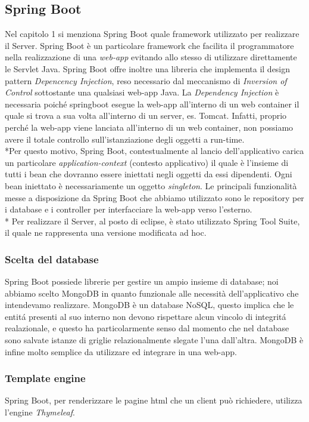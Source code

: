 \subsection{Spring Boot}
Nel capitolo 1 si menziona Spring Boot quale framework utilizzato per realizzare il Server. Spring Boot \`e un particolare framework che facilita il programmatore nella realizzazione di una \emph{web-app} evitando allo stesso di utilizzare direttamente le Servlet Java. Spring Boot offre inoltre una libreria che implementa il design pattern \emph{Depencency Injection}, reso necessario dal meccanismo di \emph{Inversion of Control} sottostante una qualsiasi web-app Java. La \emph{Dependency Injection} \`e necessaria poich\'e springboot esegue la web-app all'interno di un web container il quale si trova a sua volta all'interno di un server, es. Tomcat. Infatti, proprio perch\'e la web-app viene lanciata all'interno di un web container, non possiamo avere il totale controllo sull'istanziazione degli oggetti a run-time.\\*Per questo motivo, Spring Boot, contestualmente al lancio dell'applicativo carica un particolare \emph{application-context} (contesto applicativo) il quale \`e l'insieme di tutti i bean che dovranno essere iniettati negli oggetti da essi dipendenti. Ogni bean iniettato \`e necessariamente un oggetto \emph{singleton}.
Le principali funzionalit\`a messe a disposizione da Spring Boot che abbiamo utilizzato sono le repository per i database e i controller per interfacciare la web-app verso l'esterno.\\*
Per realizzare il Server, al posto di eclipse, \`e stato utilizzato Spring Tool Suite, il quale ne rappresenta una versione modificata ad hoc.
\subsubsection{Scelta del database}
Spring Boot possiede librerie per gestire un ampio insieme di database; noi abbiamo scelto MongoDB in quanto funzionale alle necessit\`a dell'applicativo che intendevamo realizzare. MongoDB \`e un database NoSQL, questo implica che le entit\'a presenti al suo interno non devono rispettare alcun vincolo di integrit\'a realazionale, e questo ha particolarmente senso dal momento che nel database sono salvate istanze di griglie relazionalmente slegate l'una dall'altra. MongoDB \`e infine molto semplice da utilizzare ed integrare in una web-app.
\subsubsection{Template engine}
Spring Boot, per renderizzare le pagine html che un client pu\`o richiedere, utilizza l'engine \emph{Thymeleaf}.
